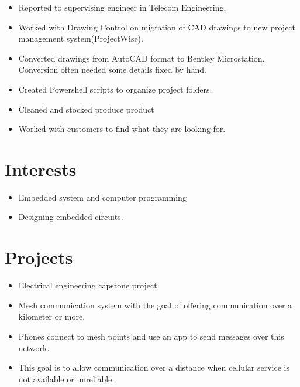 \documentclass{lsanche_cv}
\begin{document}
\begin{multicols*}{2}
    \divider

    \begin{itemize}
      \item Reported to supervising engineer in Telecom Engineering.
      \item Worked with Drawing Control on migration of CAD drawings to new project management system(ProjectWise).
      \item Converted drawings from AutoCAD format to Bentley Microstation. Conversion often needed some details fixed by hand.
      \item Created Powershell scripts to organize project folders.
    \end{itemize}

    \divider
    
    \begin{itemize}
      \item Cleaned and stocked produce product
      \item Worked with customers to find what they are looking for.
    \end{itemize}

    \columnbreak
    
  \section{Interests}
    \begin{itemize}
      \item Embedded system and computer programming
      \item Designing embedded circuits.
    \end{itemize}

    \section{Projects}

      \begin{itemize}
        \item Electrical engineering capstone project.
        \item Mesh communication system with the goal of offering communication over a kilometer or more. 
        \item Phones connect to mesh points and use an app to send messages over this network.
        \item This goal is to allow communication over a distance when cellular service is not available or unreliable.
      \end{itemize}


\end{multicols*}
\end{document}
